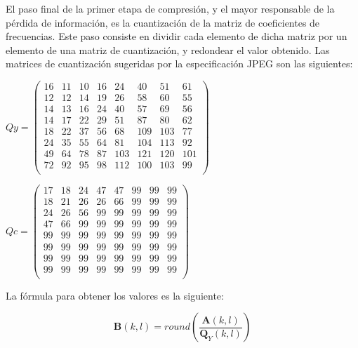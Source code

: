 \documentclass[%
final,
%
reprint,
%
notitlepage,
narroweqnarray,
inline,
twoside,
invited
]{ieee}
\begin{document}
\par El paso final de la primer etapa de compresión, y el mayor responsable de la pérdida de información, es la cuantización 
de la matriz de coeficientes de frecuencias. Este paso consiste en dividir cada elemento de dicha matriz por un elemento de una  
matriz de cuantización, y redondear el valor obtenido. 
Las matrices de cuantización sugeridas por la especificación JPEG son las siguientes:

\( Qy = 
\begin{pmatrix}
16 & 11 & 10 & 16 & 24 & 40 & 51 & 61 \\
12 & 12 & 14 & 19 & 26 & 58 & 60 & 55 \\
14 & 13 & 16 & 24 & 40 & 57 & 69 & 56 \\ 
14 & 17 & 22 & 29 & 51 & 87 & 80 & 62 \\ 
18 & 22 & 37 & 56 & 68 & 109 & 103 & 77 \\
24 & 35 & 55 & 64 & 81 & 104 & 113 & 92  \\ 
49 & 64 & 78 & 87 & 103 & 121 & 120 & 101 \\
72 & 92 & 95 & 98 & 112 & 100 & 103 & 99 \\ 
\end{pmatrix}\)
\par
\( Qc = 
\begin{pmatrix}

17 & 18 & 24 & 47 & 47 & 99 & 99 & 99 \\
18 & 21 & 26 & 26 & 66 & 99 & 99 & 99 \\
24 & 26 & 56 & 99 & 99 & 99 & 99 & 99 \\ 
47 & 66 & 99 & 99 & 99 & 99 & 99 & 99 \\ 
99 & 99 & 99 & 99 & 99 & 99 & 99 & 99 \\
99 & 99 & 99 & 99 & 99 & 99 & 99 & 99 \\
99 & 99 & 99 & 99 & 99 & 99 & 99 & 99 \\
99 & 99 & 99 & 99 & 99 & 99 & 99 & 99 \\
\end{pmatrix}\)

La fórmula para obtener los valores es la siguiente:

\begin{equation}
\label{eqCuantizacion}
\mathbf{B}(k,l)=round\left(\frac{\mathbf{A}(k,l)}{\mathbf{Q}_Y(k,l)}\right)
\end{equation}
\end{document}
